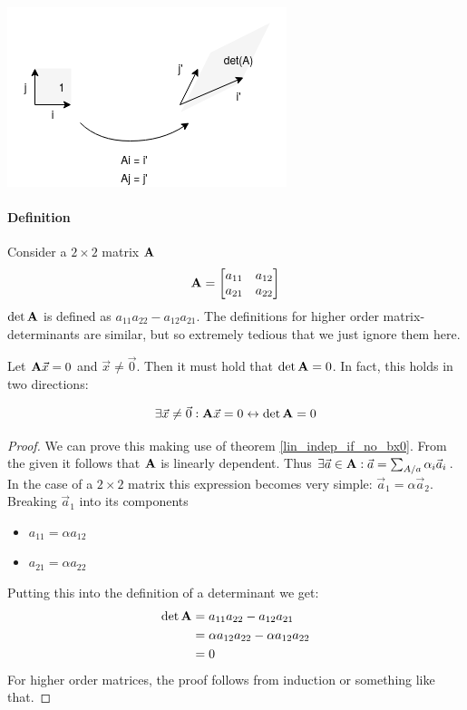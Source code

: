\includegraphics[width=0.4\linewidth]{images/determinant.png}


\paragraph{Definition} Consider a $2 \times 2$ matrix $\mathbf{A}$ 
$$
\mathbf{A} = 
\begin{bmatrix}
    a_{11} & a_{12} \\
    a_{21} & a_{22}
\end{bmatrix}
$$
$\det{\ensuremath{\mathbf{A}}}$ is defined as $a_{11}a_{22} - a_{12}a_{21}$. The definitions for higher order matrix-determinants are similar, but so extremely tedious that we just ignore them here. 


\begin{theorem}  \label{det_0}
    Let $ \mathbf{A} \vec{x} = 0 $ and $ \vec{x} \neq \vec{0}$. Then it must hold that $\det{\ensuremath{\mathbf{A}}} = 0$.
    In fact, this holds in two directions:

    $$ \exists \vec{x} \neq \vec{0}: \mathbf{A} \vec{x} = 0  \leftrightarrow \det{\ensuremath{\mathbf{A}}} = 0 $$
\end{theorem}
\begin{proof}
    We can prove this making use of theorem \ref{lin_indep_if_no_bx0}. From the given it follows that $\mathbf{A}$ is linearly dependent. 
    Thus $\exists \vec{a} \in \mathbf{A}: \vec{a} = \sum_{A/a} \alpha_i \vec{a}_i$. In the case of a $2 \times 2$ matrix this expression becomes very simple: $\vec{a}_1 = \alpha \vec{a}_2$. 
    Breaking $\vec{a}_1$ into its components
    \begin{itemize}
        \item $a_{11} = \alpha a_{12}$
        \item $a_{21} = \alpha a_{22}$
    \end{itemize}
    Putting this into the definition of a determinant we get:
    \begin{equation}
        \begin{aligned}
            \det{\ensuremath{\mathbf{A}}}  &= a_{11}a_{22} - a_{12}a_{21} \\
                            &= \alpha a_{12} a_{22} - \alpha a_{12} a_{22} \\
                            &= 0
        \end{aligned}
    \end{equation}
    For higher order matrices, the proof follows from induction or something like that.
\end{proof}




